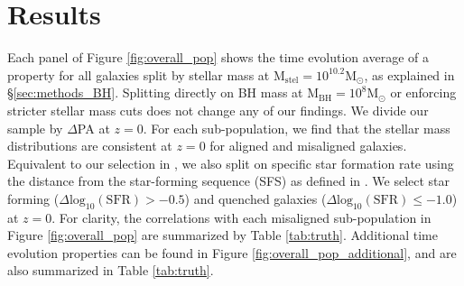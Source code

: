 \section{Results} \label{sec:results_BH}
Each panel of Figure \ref{fig:overall_pop} shows the time evolution average of a property for all galaxies split by stellar mass at $\mathrm{M_{stel} = 10^{10.2}M_{\odot}}$, as explained in \S\ref{sec:methods_BH}. Splitting directly on BH mass at $\mathrm{M_{BH} = 10^{8}M_{\odot}}$ or enforcing stricter stellar mass cuts does not change any of our findings. We divide our sample by $\Delta$PA at $z=0$. For each sub-population, we find that the stellar mass distributions are consistent at $z=0$ for aligned and misaligned galaxies. Equivalent to our selection in , we also split on specific star formation rate using the distance from the star-forming sequence (SFS) as defined in \citet{pillepich2019}. We select star forming ($\Delta \mathrm{log_{10}(SFR) > -0.5}$) and quenched galaxies ($\Delta \mathrm{log_{10}(SFR) \leq -1.0}$) at $z=0$. For clarity, the correlations with each misaligned sub-population in Figure \ref{fig:overall_pop} are summarized by Table \ref{tab:truth}. Additional time evolution properties can be found in Figure \ref{fig:overall_pop_additional}, and are also summarized in Table \ref{tab:truth}.

